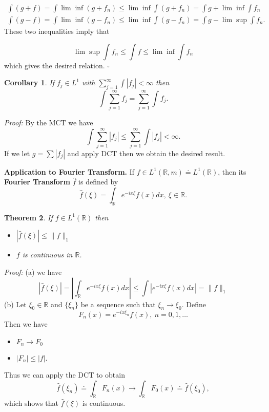 \documentclass[12pt]{report}
\newtheorem{theorem}{Theorem}[section]
\newtheorem{corollary}[theorem]{Corollary}
\begin{document}
\begin{eqnarray*}
\int (g + f) = \int \lim \inf (g + f_n) \le \lim \inf \int (g + f_n) = \int g +
\lim \inf \int f_n
\\
\int (g-f) = \int \lim \inf (g-f_n) \le \lim \inf \int (g - f_n) = \int g -
\lim \sup \int f_n.
\end{eqnarray*} These two inequalities imply that

\[
\lim\sup \int f_n \le \int f \le \lim \inf \int f_n
\] which gives the desired relation. $\square$


\begin{corollary}  If $f_j \in L^1$ with $\sum^\infty_{j=1} \int |f_j| <
\infty$ then
\[
\int \sum^\infty_{j=1} f_j = \sum^\infty_{j=1} \int f_j. 
\]
\end{corollary}
\textit{Proof:}  
By the MCT we have 
\[
\int \sum^\infty_{j=1} |f_j| \le \sum^\infty_{j=1} \int |f_j| < \infty.
\] If we let $g = \sum |f_j|$ and apply DCT then we obtain the desired
result.


\bigskip
\noindent
{\large\bf Application to Fourier Transform.}
If $f \in L^1(\mathbb{R}, m) \doteq L^1 (\mathbb{R})$, then
its \textbf{Fourier Transform} $\widehat f$ is defined by 
\[
\widehat f(\xi) = \int_{\mathbb{R}} e^{-ix \xi} f(x) dx, \ \xi \in
\mathbb{R}.
\]


\begin{theorem}  If $f \in L^1 (\mathbb{R})$ then
\begin{itemize}
\item[1.]  $|\widehat f(\xi)| \le \|f\|_1$
\item[2.] $f$\textit{ is continuous in} $\mathbb{R}$.
\end{itemize}
\end{theorem}
\textit{Proof:}
(a)  we have
\[ |\widehat f(\xi) | = \left | \int_{\mathbb{R}} e^{-ix \xi} f(x) dx \right
| \le \int \left | e^{-ix \xi} f(x) dx \right | = \|f\|_1
\]
(b)  Let $\xi_0 \in \mathbb{R}$ and $\{\xi_n\}$ be a sequence such
that $\xi_n
\longrightarrow \xi_0$.  Define
\[ F_n(x) = e^{-ix \xi_n} f(x), \ n = 0, 1, \dots
\]
 Then we have
\begin{itemize}
\item[a.] $F_n \longrightarrow F_0$
\item[b.]  $|F_n| \le |f|.$
\end{itemize} Thus we can apply the DCT to obtain
\[
\widehat f(\xi_n) \doteq \int_{\mathbb{R}} F_n (x) \longrightarrow
\int_{\mathbb{R}} F_0(x) \doteq \widehat f(\xi_0),
\] which shows that $\widehat f(\xi)$ is continuous.
\end{document}
